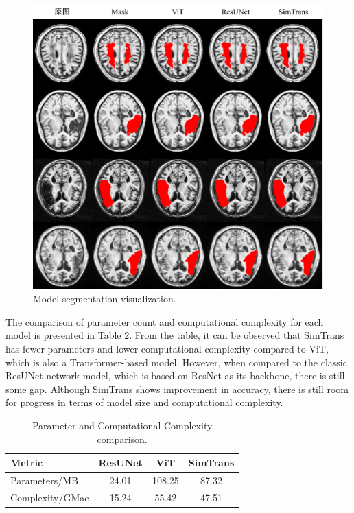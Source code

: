 \documentclass[10pt,twocolumn,letterpaper]{article}
\begin{document}
\begin{figure}[htbp]   %
	\centering
	\includegraphics[width=\linewidth,scale=1.00]{Images/Results.png}
	\caption{Model segmentation visualization.}
  \label{fig:result}
\end{figure}

The comparison of parameter count and computational complexity for each model is presented in Table 2. From the table, it can be observed that SimTrans has fewer parameters and lower computational complexity compared to ViT, which is also a Transformer-based model. However, when compared to the classic ResUNet network model, which is based on ResNet as its backbone, there is still some gap. Although SimTrans shows improvement in accuracy, there is still room for progress in terms of model size and computational complexity.

\begin{table}
  \centering
  \begin{tabular}{lccc}
    \toprule
    Metric & ResUNet & ViT & SimTrans \\
    \midrule
    Parameters/MB & 24.01 & 108.25 & 87.32 \\
    Complexity/GMac & 15.24 & 55.42 & 47.51 \\
    \bottomrule
  \end{tabular}
  \caption{Parameter and Computational Complexity comparison.}
  \label{tab:result_2}
\end{table}
\end{document}
